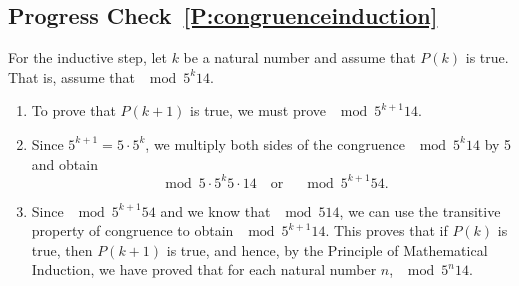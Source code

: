 \subsection*{Progress Check~\ref{P:congruenceinduction}}
For the inductive step, let $k$ be a natural number and assume that $P(k)$ is true.  That is, assume that $\mod{ 5^k }{1}{4}$.
\begin{enumerate}
  \item To prove that $P(k+1)$ is true, we must prove $\mod{5^{k+1}}{1}{4}$.
  \item Since $5^{k+1} = 5 \cdot 5^k$, we multiply both sides of the congruence $\mod{ 5^k }{1}{4}$ by 5 and obtain
\[
\mod{5 \cdot 5^k}{5 \cdot 1}{4} \quad \text{or} \quad \mod{5^{k+1}}{5}{4}.
\]
  \item Since $\mod{5^{k+1}}{5}{4}$ and we know that $\mod{5}{1}{4}$, we can use the transitive property of congruence to obtain $\mod{5^{k+1}}{1}{4}$.  This proves that if $P(k)$ is true, then $P(k+1)$ is true, and hence, by the Principle of Mathematical Induction, we have proved that for each natural number $n$, 
$\mod{5^n}{1}{4}$.
\end{enumerate}
\hbreak

\endinput
